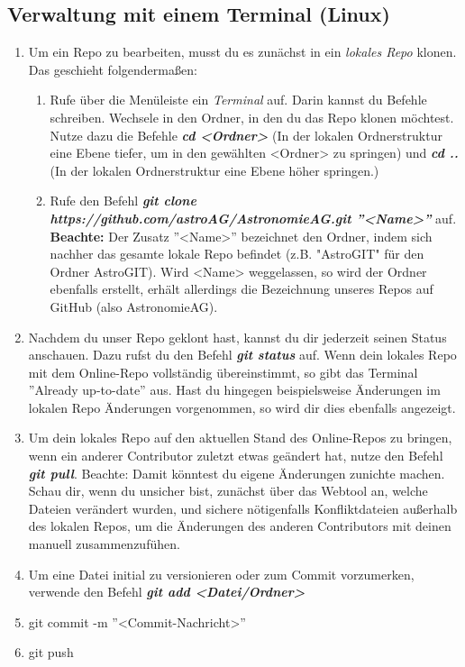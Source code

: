\documentclass[12pt,a4paper,notitlepage,onecolumn,portrait,oneside, , , ]{scrartcl}
\begin{document}
\subsection{Verwaltung mit einem Terminal (Linux)}
\begin{enumerate}[label=\arabic*.]
\item Um ein Repo zu bearbeiten, musst du es zunächst in ein \textit{lokales Repo} klonen. Das geschieht folgendermaßen:
\begin{enumerate}[label=(\alph*)]
\item Rufe über die Menüleiste ein \textit{Terminal} auf. Darin kannst du Befehle schreiben. Wechsele in den Ordner, in den du das Repo klonen möchtest. Nutze dazu die Befehle \textbf{\textit{cd <Ordner>}} (In der lokalen Ordnerstruktur eine Ebene tiefer, um in den gewählten <Ordner> zu springen) und \textbf{\textit{cd ..}} (In der lokalen Ordnerstruktur eine Ebene höher springen.)
\item Rufe den Befehl \textbf{\textit{git clone https://github.com/astroAG/AstronomieAG.git ''<Name>''}} auf. \textbf{Beachte:} Der Zusatz ''<Name>'' bezeichnet den Ordner, indem sich nachher das gesamte lokale Repo befindet (z.B. "AstroGIT" für den Ordner AstroGIT). Wird <Name> weggelassen, so wird der Ordner ebenfalls erstellt, erhält allerdings die Bezeichnung unseres Repos auf GitHub (also AstronomieAG).
\end{enumerate}
\item Nachdem du unser Repo geklont hast, kannst du dir jederzeit seinen Status anschauen. Dazu rufst du den Befehl \textbf{\textit{git status}} auf. Wenn dein lokales Repo mit dem Online-Repo vollständig übereinstimmt, so  gibt das Terminal ''Already up-to-date'' aus. Hast du hingegen beispielsweise Änderungen im lokalen Repo Änderungen vorgenommen, so wird dir dies ebenfalls angezeigt.
\item Um dein lokales Repo auf den aktuellen Stand des Online-Repos zu bringen, wenn ein anderer Contributor zuletzt etwas geändert hat, nutze den Befehl \textbf{\textit{git pull}}. Beachte: Damit könntest du eigene Änderungen zunichte machen. Schau dir, wenn du unsicher bist, zunächst über das Webtool an, welche Dateien verändert wurden, und sichere nötigenfalls Konfliktdateien außerhalb des lokalen Repos, um die Änderungen des anderen Contributors mit deinen manuell zusammenzufühen.
\item Um eine Datei initial zu versionieren oder zum Commit vorzumerken, verwende den Befehl \textbf{\textit{git add <Datei/Ordner>}}
\item git commit -m ''<Commit-Nachricht>''
\item git push
\end{enumerate}
\end{document}
